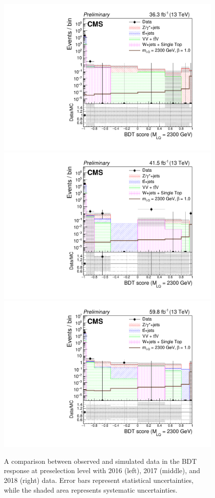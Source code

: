 \begin{figure}[H]
    {\includegraphics[width=.32\textwidth]{Images/Analysis/Results_2016_Unblinded/Plots/Preselection/BasicLQ_uujj_LQToBMu_pair_uubj_BDT_discrim_M2300_standard.pdf}}
    {\includegraphics[width=.32\textwidth]{Images/Analysis/Results_2017_Unblinded/Plots/Preselection/BasicLQ_uujj_LQToBMu_pair_uubj_BDT_discrim_M2300_standard.pdf}}
    {\includegraphics[width=.32\textwidth]{Images/Analysis/Results_2018_Unblinded/Plots/Preselection/BasicLQ_uujj_LQToBMu_pair_uubj_BDT_discrim_M2300_standard.pdf}}
    \caption{A comparison between observed and simulated data in the BDT response at preselection level with 2016 (left), 2017 (middle), and 2018 (right) data. Error bars represent statistical uncertainties, while the shaded area represents systematic uncertainties.}
    \label{figapp:BDT2100to2300}
\end{figure}

